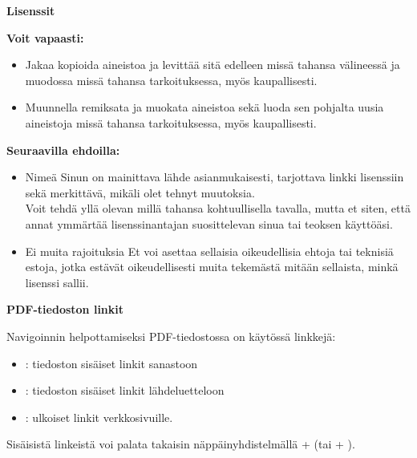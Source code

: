 
\pagestyle{empty}

{\large\textbf{Lisenssit}}



\textbf{Voit vapaasti:}
\begin{itemize}
  \item Jakaa {\textemdash} kopioida aineistoa ja levittää sitä edelleen missä tahansa välineessä ja muodossa missä tahansa tarkoituksessa, myös kaupallisesti.
  \item Muunnella {\textemdash} remiksata ja muokata aineistoa sekä luoda sen pohjalta uusia aineistoja missä tahansa tarkoituksessa, myös kaupallisesti.
\end{itemize}

\textbf{Seuraavilla ehdoilla:}
\begin{itemize}
  \item Nimeä {\textemdash} Sinun on mainittava lähde asianmukaisesti, tarjottava linkki lisenssiin sekä merkittävä, mikäli olet tehnyt muutoksia.\\ Voit tehdä yllä olevan millä tahansa kohtuullisella tavalla, mutta et siten, että annat ymmärtää lisenssinantajan suosittelevan sinua tai teoksen käyttöäsi.
  \item Ei muita rajoituksia {\textemdash} Et voi asettaa sellaisia oikeudellisia ehtoja tai teknisiä estoja, jotka estävät oikeudellisesti muita tekemästä mitään sellaista, minkä lisenssi sallii.
\end{itemize}
\bigskip
{\large\textbf{PDF-tiedoston linkit}}

Navigoinnin helpottamiseksi PDF-tiedostossa on käytössä linkkejä:

\begin{itemize}
  \item{}: tiedoston sisäiset linkit sanastoon
  \item{}: tiedoston sisäiset linkit lähdeluetteloon
  \item {}: ulkoiset linkit verkkosivuille.
\end{itemize}

\noindent Sisäisistä linkeistä voi palata takaisin näppäinyhdistelmällä + 
(tai + ).
\restoregeometry
\clearpage
